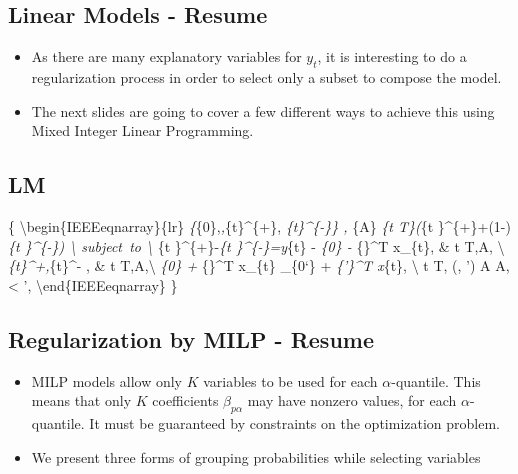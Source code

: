 \subsection{Linear Models - Resume}\label{linear-models---resume}

\begin{itemize}
\item
  As there are many explanatory variables for \(y_t\), it is interesting
  to do a regularization process in order to select only a subset to
  compose the model.
\item
  The next slides are going to cover a few different ways to achieve
  this using Mixed Integer Linear Programming.
\end{itemize}

\subsection{LM}\label{lm}

\{ \textbackslash{}begin\{IEEEeqnarray\}\{lr\}
\min\emph{\{\beta}\{0\alpha\},\beta\emph{\alpha,\varepsilon}\{t\alpha\}\^{}\{+\},
\varepsilon\emph{\{t\alpha\}\^{}\{-\}\} , \sum}\{\alpha \in A\}
\sum\emph{\{t \in T\}\left(\alpha \varepsilon}\{t
\alpha\}\^{}\{+\}+(1-\alpha)\varepsilon\emph{\{t
\alpha\}\^{}\{-\}\right) \span \label{eq:linear-opt-1}\textbackslash{}
\mbox{subject to} \span \nonumber \textbackslash{} \varepsilon}\{t
\alpha\}\^{}\{+\}-\varepsilon\emph{\{t \alpha\}\^{}\{-\}=y}\{t\} -
\beta\emph{\{0\alpha\} - \beta}\{\alpha\}\^{}T x\_\{t\}, \& \forall t
\in T,\qquad \forall \alpha \in A, \textbackslash{}
\varepsilon\emph{\{t\alpha\}\^{}+,\varepsilon}\{t\alpha\}\^{}- ,
\& \forall t \in T,\forall \alpha \in A,\textbackslash{}
\beta\emph{\{0\alpha\} + \beta}\{\alpha\}\^{}T x\_\{t\}
\leq \beta\_\{0\alpha`\} + \beta\emph{\{\alpha'\}\^{}T x}\{t\},
\span \nonumber \textbackslash{} \span \label{eq:linear-opt-ult}
\forall t \in T, \forall (\alpha, \alpha') \in A \times A,
\alpha \textless{} \alpha', \textbackslash{}end\{IEEEeqnarray\} \}

\subsection{Regularization by MILP -
Resume}\label{regularization-by-milp---resume}

\begin{itemize}
\item
  MILP models allow only \(K\) variables to be used for each
  \(\alpha\)-quantile. This means that only \(K\) coefficients
  \(\beta_{p\alpha}\) may have nonzero values, for each
  \(\alpha\)-quantile. It must be guaranteed by constraints on the
  optimization problem.
\item
  We present three forms of grouping probabilities while selecting
  variables
\end{itemize}

